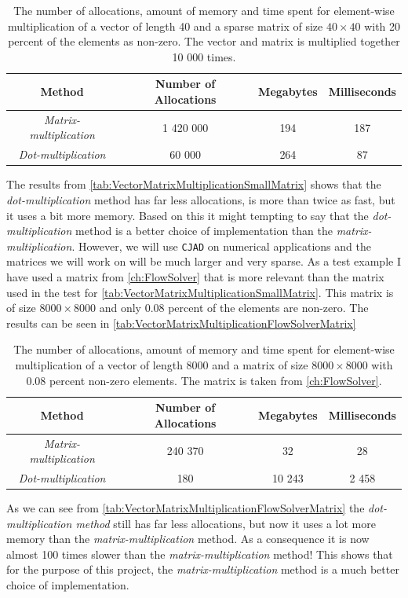 \begin{table}[H]
    \centering
    \caption{The number of allocations, amount of memory and time spent for element-wise multiplication of a vector of length 40 and a sparse matrix of size $40\times 40$ with 20 percent of the elements as non-zero. The vector and matrix is multiplied together 10 000 times.}
    \label{tab:VectorMatrixMultiplicationSmallMatrix}
    \def\arraystretch{1.5}
    \begin{tabular}{cccc}
    \textbf{Method} & \textbf{Number of Allocations} & \textbf{Megabytes} & \textbf{Milliseconds} \\
        \hline
         \textit{Matrix-multiplication} & 1 420 000 & 194 & 187 \\  
         \textit{Dot-multiplication} & 60 000 & 264 & 87\\ 
         \hline
    \end{tabular}
\end{table}
The results from \autoref{tab:VectorMatrixMultiplicationSmallMatrix} shows that the \textit{dot-multiplication} method has far less allocations, is more than twice as fast, but it uses a bit more memory. Based on this it might tempting to say that the \textit{dot-multiplication} method is a better choice of implementation than the \textit{matrix-multiplication}. However, we will use \texttt{CJAD} on numerical applications and the matrices we will work on will be much larger and very sparse. As a test example I have used a matrix from \autoref{ch:FlowSolver} that is more relevant than the matrix used in the test for \autoref{tab:VectorMatrixMultiplicationSmallMatrix}. This matrix is of size $8000\times 8000$ and only 0.08 percent of the elements are non-zero. The results can be seen in \autoref{tab:VectorMatrixMultiplicationFlowSolverMatrix}
\begin{table}[H]
    \centering
    \caption{The number of allocations, amount of memory and time spent for element-wise multiplication of a vector of length 8000 and a matrix of size $8000\times 8000$ with 0.08 percent non-zero elements. The matrix is taken from \autoref{ch:FlowSolver}.}
    \label{tab:VectorMatrixMultiplicationFlowSolverMatrix}
    \def\arraystretch{1.5}
    \begin{tabular}{cccc}
    \textbf{Method} & \textbf{Number of Allocations} & \textbf{Megabytes} & \textbf{Milliseconds} \\
        \hline
         \textit{Matrix-multiplication} & 240 370 & 32 & 28 \\  
         \textit{Dot-multiplication} & 180 & 10 243 & 2 458\\ 
         \hline
    \end{tabular}
\end{table}
As we can see from \autoref{tab:VectorMatrixMultiplicationFlowSolverMatrix} the \textit{dot-multiplication method} still has far less allocations, but now it uses a lot more memory than the \textit{matrix-multiplication} method. As a consequence it is now almost 100 times slower than the \textit{matrix-multiplication} method! This shows that for the purpose of this project, the \textit{matrix-multiplication} method is a much better choice of implementation.


